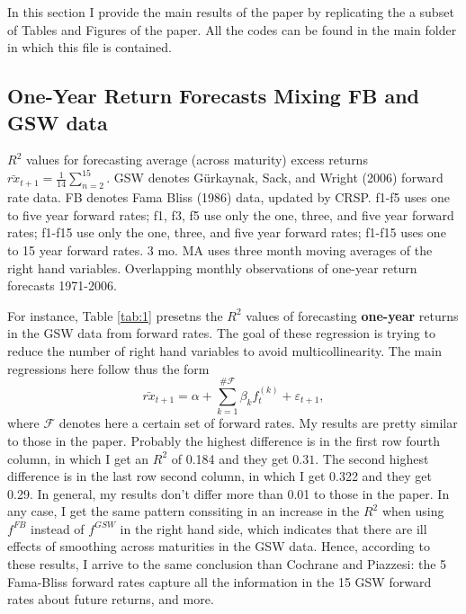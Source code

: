 
In this section I provide the main results of the paper by replicating the a subset of Tables and Figures of the paper. All the codes can be found in the main folder in which this file is contained.

\subsection{One-Year Return Forecasts Mixing FB and GSW data}

\begin{table}[h!]
	\centering
	\caption{$R^2$ values for forecasting average (across maturity) excess returns $\bar{rx}_{t+1} = \frac{1}{14}\sum_{n=2}^{15}$. GSW denotes Gürkaynak, Sack, and Wright (2006) forward rate data. FB denotes Fama Bliss (1986) data, updated by CRSP. f1-f5 uses one to five year forward rates; f1, f3, f5 use only the one, three, and five year forward rates; f1-f15 use only the one, three, and five year forward rates; f1-f15 uses one to 15 year forward rates. 3 mo. MA uses three month moving averages of the right hand variables. Overlapping monthly observations of one-year return forecasts 1971-2006.}\label{tab:1}
	
\end{table}


For instance, Table \ref{tab:1} presetns the $R^2$ values of forecasting \textbf{one-year} returns in the GSW data from forward rates. The goal of these regression is trying to reduce the number of right hand variables to avoid multicollinearity. The main regressions here follow thus the form
\begin{equation}
	\bar{rx}_{t+1} = \alpha + \sum_{k=1}^{\#\mathcal{F}}\beta_k f_{t}^{(k)} + \varepsilon_{t+1},
\end{equation}
where $\mathcal{F}$ denotes here a certain set of forward rates. My results are pretty similar to those in the paper. Probably the highest difference is in the first row fourth column, in which I get an $R^2$ of 0.184 and they get $0.31$. The second highest difference is in the last row second column, in which I get 0.322 and they get 0.29. In general, my results don't differ more than 0.01 to those in the paper. In any case, I get the same pattern conssiting in an increase in the $R^2$ when using $f^{FB}$ instead of $f^{GSW}$ in the right hand side, which indicates that there are ill effects of smoothing across maturities in the GSW data. Hence, according to these results, I arrive to the same conclusion than Cochrane and Piazzesi: the 5 Fama-Bliss forward rates capture all the information in the 15 GSW forward rates about future returns, and more.

